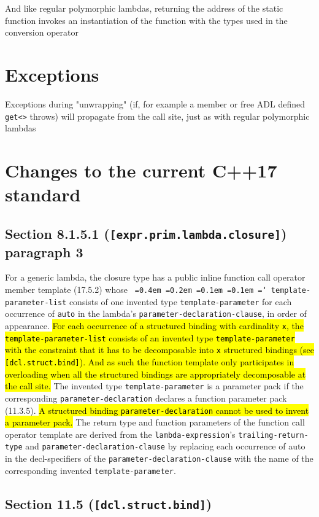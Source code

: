 \documentclass{article}
\DeclareRobustCommand{\hlgreen}[1]{{\sethlcolor{green}\hl{#1}}}
\newcommand*\justify{%
  \fontdimen2\font=0.4em%
  \fontdimen3\font=0.2em%
  \fontdimen4\font=0.1em%
  \fontdimen7\font=0.1em%
  \hyphenchar\font=`\-%
}
\begin{document}
And like regular polymorphic lambdas, returning the address of the static
function invokes an instantiation of the function with the types used in the
conversion operator

\section{Exceptions}
Exceptions during "unwrapping" (if, for example a member or free ADL defined
\texttt{get<>} throws) will propagate from the call site, just as with regular
polymorphic lambdas


\section{Changes to the current C++17 standard}
\subsection{Section 8.1.5.1 (\texttt{[expr.prim.lambda.closure]}) paragraph 3}

For a generic lambda, the closure type has a public inline function call
operator member template (17.5.2) whose \texttt{\justify template-parameter-list}
consists of one invented type \texttt{template-parameter} for each occurrence
of \texttt{auto} in the lambda’s \texttt{parameter-declaration-clause}, in
order of appearance.  \hlgreen{For each occurrence of a structured binding with
cardinality \texttt{x}, the \texttt{template-parameter-list} consists of an
invented type \texttt{template-parameter} with the constraint that it has to
be decomposable into \texttt{x} structured bindings (see
\texttt{[dcl.struct.bind]}).  And as such the function template only
participates in overloading when all the structured bindings are appropriately
decomposable at the call site.} The invented type \texttt{template-parameter}
is a parameter pack if the corresponding \texttt{parameter-declaration}
declares a function parameter pack (11.3.5).  \hlgreen{A structured binding
\texttt{parameter-declaration} cannot be used to invent a parameter pack.} The
return type and function parameters of the function call operator template are
derived from the \texttt{lambda-expression}’s \texttt{trailing-return-type}
and \texttt{parameter-declaration-clause} by replacing each occurrence of auto
in the decl-specifiers of the \texttt{parameter-declaration-clause} with the
name of the corresponding invented \texttt{template-parameter}.


\subsection{Section 11.5 (\texttt{[dcl.struct.bind]})}
\end{document}

